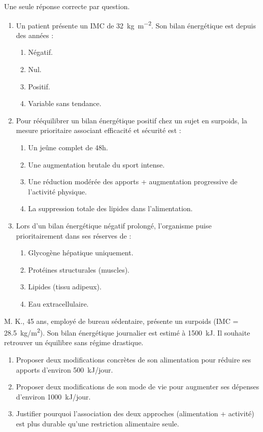 \documentclass[11pt]{article}
\begin{document}
\begin{exercice}
Une seule réponse correcte par question.
\begin{enumerate}
    \item Un patient présente un IMC de \SI{32}{\kg\per\m\squared}. Son bilan énergétique est depuis des années :
    \begin{enumerate}
        \item Négatif. \item Nul. \item Positif. \item Variable sans tendance.
    \end{enumerate}
    \item Pour rééquilibrer un bilan énergétique positif chez un sujet en surpoids, la mesure prioritaire associant efficacité et sécurité est :
    \begin{enumerate}
        \item Un jeûne complet de 48h. \item Une augmentation brutale du sport intense.
        \item Une réduction modérée des apports + augmentation progressive de l'activité physique.
        \item La suppression totale des lipides dans l'alimentation.
    \end{enumerate}
    \item Lors d'un bilan énergétique négatif prolongé, l'organisme puise prioritairement dans ses réserves de :
    \begin{enumerate}
        \item Glycogène hépatique uniquement. \item Protéines structurales (muscles).
        \item Lipides (tissu adipeux). \item Eau extracellulaire.
    \end{enumerate}
\end{enumerate}
\end{exercice}

\begin{exercice}
M. K., 45 ans, employé de bureau sédentaire, présente un surpoids (IMC = \SI{28,5}{kg/m^2}). Son bilan énergétique journalier est estimé à \SI{+1500}{kJ}. Il souhaite retrouver un équilibre sans régime drastique.
\begin{enumerate}
    \item Proposer deux modifications concrètes de son alimentation pour réduire ses apports d'environ \SI{500}{kJ/jour}.
    \item Proposer deux modifications de son mode de vie pour augmenter ses dépenses d'environ \SI{1000}{kJ/jour}.
    \item Justifier pourquoi l'association des deux approches (alimentation + activité) est plus durable qu'une restriction alimentaire seule.
\end{enumerate}
\end{exercice}
\end{document}

